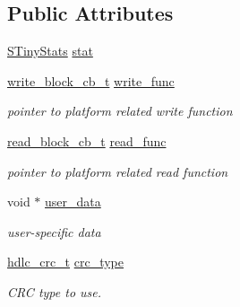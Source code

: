 \subsection*{Public Attributes}
\begin{DoxyCompactItemize}
\item 
\hyperlink{structSTinyStats}{S\+Tiny\+Stats} \hyperlink{structSTinyLightData_a623323a7a84807b5ce14a7cb56ec07f0}{stat}
\item 
\mbox{\label{structSTinyLightData_a0bd1b1a01e1eaa15f22dec1e886c2e3c}} 
\hyperlink{tiny__types_8h_aafd634660bba76cace57a8f9b01e044d}{write\+\_\+block\+\_\+cb\+\_\+t} \hyperlink{structSTinyLightData_a0bd1b1a01e1eaa15f22dec1e886c2e3c}{write\+\_\+func}
\begin{DoxyCompactList}\small\item\em pointer to platform related write function \end{DoxyCompactList}\item 
\mbox{\label{structSTinyLightData_af9b045852adb08c137abce21d02f00ea}} 
\hyperlink{tiny__types_8h_a15bec127d9ee63658563d62e92b5261b}{read\+\_\+block\+\_\+cb\+\_\+t} \hyperlink{structSTinyLightData_af9b045852adb08c137abce21d02f00ea}{read\+\_\+func}
\begin{DoxyCompactList}\small\item\em pointer to platform related read function \end{DoxyCompactList}\item 
\mbox{\label{structSTinyLightData_a5208b2627e6bda09c3b839f4d1ad2815}} 
void $\ast$ \hyperlink{structSTinyLightData_a5208b2627e6bda09c3b839f4d1ad2815}{user\+\_\+data}
\begin{DoxyCompactList}\small\item\em user-\/specific data \end{DoxyCompactList}\item 
\mbox{\label{structSTinyLightData_a0f907cef40c01228a183b3e13b4ebf37}} 
\hyperlink{group__HDLC__API_gabb73b32d08d8e79eefe9385634a74bf7}{hdlc\+\_\+crc\+\_\+t} \hyperlink{structSTinyLightData_a0f907cef40c01228a183b3e13b4ebf37}{crc\+\_\+type}
\begin{DoxyCompactList}\small\item\em C\+RC type to use. \end{DoxyCompactList}\end{DoxyCompactItemize}


